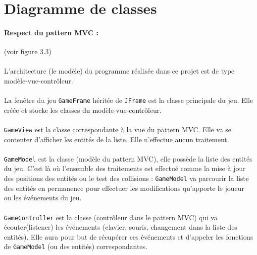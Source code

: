 \documentclass[a4paper,12pt]{report}
\begin{document}
\section{Diagramme de classes}

\paragraph{Respect du pattern MVC :}(voir figure 3.3)

\paragraph{}L'architecture (le modèle) du programme réalisée dans ce projet est de type modèle-vue-contrôleur.

\paragraph{}La fenêtre du jeu \verb+GameFrame+ héritée de \verb+JFrame+ est la classe principale du jeu. Elle créée et  stocke les classes du modèle-vue-contrôleur.   

\paragraph{}\verb+GameView+ est la classe correspondante à la vue du pattern MVC. Elle va se contenter d'afficher les entités de la liste. Elle n'effectue aucun traitement.

\paragraph{}\verb+GameModel+ est la classe (modèle du pattern MVC), elle possède la liste des entités du jeu. C'est là où l'ensemble des traitements est effectué comme la mise à jour des positions des entités ou le test des collisions : \verb+GameModel+ va parcourir la liste des entités en permanence pour effectuer les modifications qu'apporte le joueur ou les événements du jeu.

\paragraph{}\verb+GameController+ est la classe (contrôleur dans le pattern MVC) qui va écouter(listener) les événements (clavier, souris, changement dans la liste des entités). Elle aura pour but de récupérer ces événements et d'appeler les fonctions de \verb+GameModel+ (ou des entités) correspondantes.
\end{document}
